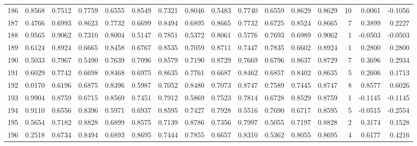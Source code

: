 \begin{tabular}{lrrrrrrrrrrrrrrr}
186 &      0.8568 &  0.7512 &  0.7759 &  0.6555 &  0.8549 &  0.7321 &  0.8046 &  0.5483 &  0.7740 &  0.6559 &   0.8629 &     0.8629 &     10 &                    0.0061 &                    -0.1056 \\
187 &      0.4766 &  0.6993 &  0.8623 &  0.7732 &  0.6699 &  0.8494 &  0.6895 &  0.8665 &  0.7732 &  0.6725 &   0.8524 &     0.8665 &      7 &                    0.3899 &                     0.2227 \\
188 &      0.9565 &  0.9062 &  0.7310 &  0.8004 &  0.5147 &  0.7851 &  0.5372 &  0.8061 &  0.5776 &  0.7693 &   0.6989 &     0.9062 &      1 &                   -0.0503 &                    -0.0503 \\
189 &      0.6124 &  0.8924 &  0.6665 &  0.8458 &  0.6767 &  0.8535 &  0.7059 &  0.8711 &  0.7447 &  0.7835 &   0.6602 &     0.8924 &      1 &                    0.2800 &                     0.2800 \\
190 &      0.5033 &  0.7967 &  0.5490 &  0.7639 &  0.7096 &  0.8579 &  0.7190 &  0.8729 &  0.7669 &  0.6796 &   0.8637 &     0.8729 &      7 &                    0.3696 &                     0.2934 \\
191 &      0.6029 &  0.7742 &  0.6698 &  0.8468 &  0.6975 &  0.8635 &  0.7761 &  0.6687 &  0.8462 &  0.6857 &   0.8402 &     0.8635 &      5 &                    0.2606 &                     0.1713 \\
192 &      0.0170 &  0.6196 &  0.6875 &  0.8396 &  0.5987 &  0.7052 &  0.8480 &  0.7073 &  0.8747 &  0.7589 &   0.7445 &     0.8747 &      8 &                    0.8577 &                     0.6026 \\
193 &      0.9904 &  0.8759 &  0.6715 &  0.8569 &  0.7451 &  0.7912 &  0.5869 &  0.7523 &  0.7814 &  0.6728 &   0.8529 &     0.8759 &      1 &                   -0.1145 &                    -0.1145 \\
194 &      0.9110 &  0.6556 &  0.8396 &  0.5971 &  0.6937 &  0.8595 &  0.7427 &  0.7928 &  0.5516 &  0.7690 &   0.6717 &     0.8595 &      5 &                   -0.0515 &                    -0.2554 \\
195 &      0.5654 &  0.7182 &  0.8828 &  0.6899 &  0.8575 &  0.7139 &  0.8786 &  0.7356 &  0.7997 &  0.5055 &   0.7197 &     0.8828 &      2 &                    0.3174 &                     0.1528 \\
196 &      0.2518 &  0.6734 &  0.8494 &  0.6893 &  0.8695 &  0.7444 &  0.7855 &  0.6657 &  0.8310 &  0.5362 &   0.8055 &     0.8695 &      4 &                    0.6177 &                     0.4216 \\

\end{tabular}
